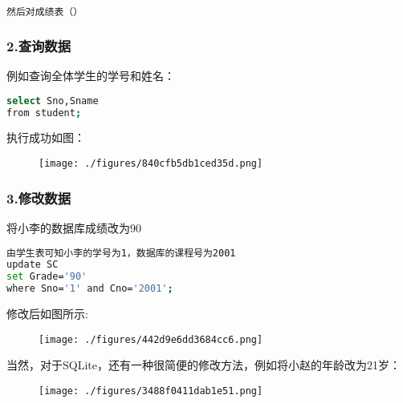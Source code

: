 \begin{lstlisting}[language=bash]
然后对成绩表（）
\end{lstlisting}



\subsubsection{2.查询数据}
例如查询全体学生的学号和姓名：
\begin{lstlisting}[language=bash]
select Sno,Sname
from student;
\end{lstlisting}

执行成功如图：
\begin{figure}[ht]
\centering
\texttt{[image: ./figures/840cfb5db1ced35d.png]}
\caption{} \label{fig_SQLint_14}
\end{figure}

\subsubsection{3.修改数据}
将小李的数据库成绩改为90
\begin{lstlisting}[language=bash]
由学生表可知小李的学号为1，数据库的课程号为2001
update SC
set Grade='90'
where Sno='1' and Cno='2001';
\end{lstlisting}
修改后如图所示:
\begin{figure}[ht]
\centering
\texttt{[image: ./figures/442d9e6dd3684cc6.png]}
\caption{} \label{fig_SQLint_15}
\end{figure}
当然，对于SQLite，还有一种很简便的修改方法，例如将小赵的年龄改为21岁：
\begin{figure}[ht]
\centering
\texttt{[image: ./figures/3488f0411dab1e51.png]}
\caption{} \label{fig_SQLint_16}
\end{figure}




